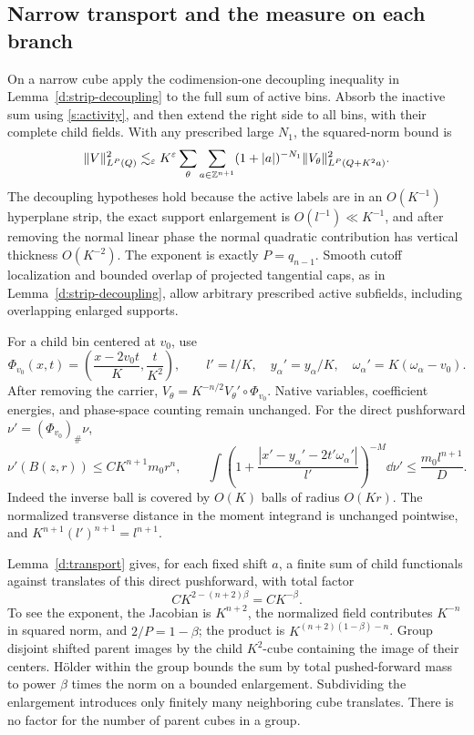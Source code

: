 \subsection{Narrow transport and the measure on each branch}

On a narrow cube apply the codimension-one decoupling inequality in
Lemma~\ref{d:strip-decoupling} to the full sum of active bins.  Absorb
the inactive sum using \eqref{s:activity}, and then extend the right
side to all bins, with their complete child fields.  With any prescribed
large $N_1$, the squared-norm bound is
\begin{equation}\label{s:narrow-decoupling}
 \lVert V\rVert_{L^P(Q)}^2\lesssim_\varepsilon K^\varepsilon
       \sum_\theta\sum_{a\in\mathbb Z^{n+1}}(1+|a|)^{-N_1}
                   \lVert V_\theta\rVert_{L^P(Q+K^2a)}^2.
\end{equation}
The decoupling hypotheses hold because the active labels are in an
$O(K^{-1})$ hyperplane strip, the exact support enlargement is
$O(l^{-1})\ll K^{-1}$, and after removing the normal linear phase the
normal quadratic contribution has vertical thickness $O(K^{-2})$.
The exponent is exactly $P=q_{n-1}$.  Smooth cutoff localization and
bounded overlap of projected tangential caps, as in
Lemma~\ref{d:strip-decoupling}, allow arbitrary prescribed active
subfields, including overlapping enlarged supports.

For a child bin centered at $v_0$, use
\begin{equation}\label{s:child-map}
 \Phi_{v_0}(x,t)=\left(\frac{x-2v_0t}{K},\frac t{K^2}\right),
 \qquad l'=l/K,\quad y_\alpha'=y_\alpha/K,\quad
 \omega_\alpha'=K(\omega_\alpha-v_0).
\end{equation}
After removing the carrier, $V_\theta=K^{-n/2}V_\theta'\circ\Phi_{v_0}$.
Native variables, coefficient energies, and phase-space counting remain
unchanged.  For the direct pushforward $\nu'=(\Phi_{v_0})_\#\nu$,
\begin{equation}\label{s:direct-measure}
 \nu'(B(z,r))\le C K^{n+1}m_0r^n,\qquad
 \int\left(1+\frac{|x'-y_\alpha'-2t'\omega_\alpha'|}{l'}\right)^{-M}
                  \dd\nu'\le\frac{m_0l^{n+1}}D.
\end{equation}
Indeed the inverse ball is covered by $O(K)$ balls of radius $O(Kr)$.
The normalized transverse distance in the moment integrand is unchanged
pointwise, and $K^{n+1}(l')^{n+1}=l^{n+1}$.

Lemma~\ref{d:transport} gives, for each fixed shift $a$, a
finite sum of child functionals against translates of this direct
pushforward, with total factor
\begin{equation}\label{s:transport-power}
 CK^{2-(n+2)\beta}=CK^{-\beta}.
\end{equation}
To see the exponent, the Jacobian is $K^{n+2}$, the normalized field
contributes $K^{-n}$ in squared norm, and $2/P=1-\beta$; the product
is $K^{(n+2)(1-\beta)-n}$.  Group disjoint shifted parent images by
the child $K^2$-cube containing the image of their centers.  H\"older
within the group bounds the sum by total pushed-forward mass to power
$\beta$ times the norm on a bounded enlargement.  Subdividing the
enlargement introduces only finitely many neighboring cube translates.
There is no factor for the number of parent cubes in a group.


